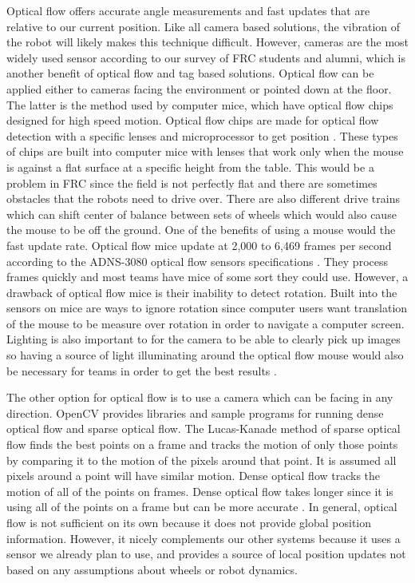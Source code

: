 \documentclass{article}
\begin{document}
  Optical flow offers accurate angle measurements and fast updates that are relative to our current position. Like all camera based solutions, the vibration of the robot will likely makes this technique difficult. However, cameras are the most widely used sensor according to our survey of FRC students and alumni, which is another benefit of optical flow and tag based solutions. Optical flow can be applied either to cameras facing the environment or pointed down at the floor.
  The latter is the method used by computer mice, which have optical flow chips designed for high speed motion. Optical flow chips are made for optical flow detection with a specific lenses and microprocessor to get position \cite{font_characterization_2011}. These types of chips are built into computer mice with lenses that work only when the mouse is against a flat surface at a specific height from the table. This would be a problem in FRC since the field is not perfectly flat and there are sometimes obstacles that the robots need to drive over. There are also different drive trains which can shift center of balance between sets of wheels which would also cause the mouse to be off the ground. One of the benefits of using a mouse would the fast update rate. Optical flow mice update at 2,000 to 6,469 frames per second according to the ADNS-3080 optical flow sensors specifications \cite{sun_optical_2008}. They process frames quickly and most teams have mice of some sort they could use. However, a drawback of optical flow mice is their inability to detect rotation. Built into the sensors on mice are ways to ignore rotation since computer users want translation of the mouse to be measure over rotation in order to navigate a computer screen. Lighting is also important to for the camera to be able to clearly pick up images so having a source of light illuminating around the optical flow mouse would also be necessary for teams in order to get the best results \cite{font_characterization_2011}.

  The other option for optical flow is to use a camera which can be facing in any direction. OpenCV provides libraries and sample programs for running dense optical flow and sparse optical flow. The Lucas-Kanade method of sparse optical flow finds the best points on a frame and tracks the motion of only those points by comparing it to the motion of the pixels around that point. It is assumed all pixels around a point will have similar motion. Dense optical flow tracks the motion of all of the points on frames. Dense optical flow takes longer since it is using all of the points on a frame but can be more accurate \cite{itseez_opencv_2017}. In general, optical flow is not sufficient on its own because it does not provide global position information. However, it nicely complements our other systems because it uses a sensor we already plan to use, and provides a source of local position updates not based on any assumptions about wheels or robot dynamics.
\end{document}
